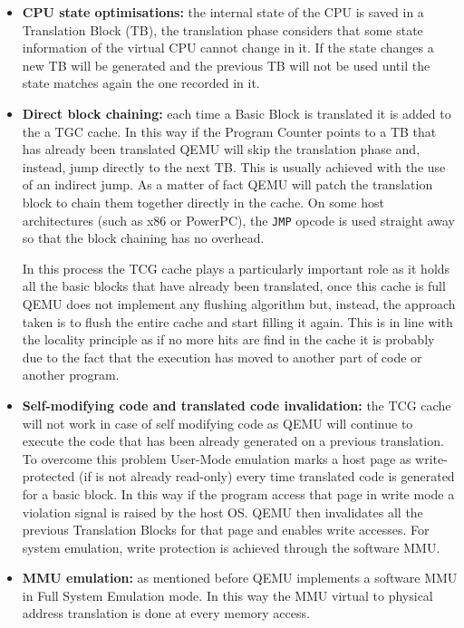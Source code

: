 \begin{itemize}
    \item \textbf{CPU state optimisations:} the internal state of the CPU is saved in a Translation Block (TB), the translation phase considers that some state information of the virtual CPU cannot change in it. If the state changes a new TB will be generated and the previous TB will not be used until the state matches again the one recorded in it.
    
    \item \textbf{Direct block chaining:} each time a Basic Block is translated it is added to the a TGC cache. In this way if the Program Counter points to a TB that has already been translated QEMU will skip the translation phase and, instead, jump directly to the next TB. This is usually achieved with the use of an indirect jump. As a matter of fact QEMU will patch the translation block to chain them together directly in the cache. On some host architectures (such as x86 or PowerPC), the \lstinline{JMP} opcode is used straight away so that the block chaining has no overhead.
    
    In this process the TCG cache plays a particularly important role as it holds all the basic blocks that have already been translated, once this cache is full QEMU does not implement any flushing algorithm but, instead, the approach taken is to flush the entire cache and start filling it again. This is in line with the locality principle as if no more hits are find in the cache it is probably due to the fact that the execution has moved to another part of code or another program.
    
    \item \textbf{Self-modifying code and translated code invalidation:} the TCG cache will not work in case of self modifying code as QEMU will continue to execute the code that has been already generated on a previous translation. To overcome this problem User-Mode emulation marks a host page as write-protected (if is not already read-only) every time translated code is generated for a basic block. In this way if the program access that page in write mode a violation signal is raised by the host OS. QEMU then invalidates all the previous Translation Blocks for that page and enables write accesses. For system emulation, write protection is achieved through the software MMU.
    
    
    \item \textbf{MMU emulation:} as mentioned before QEMU implements a software MMU in Full System Emulation mode. In this way the MMU virtual to physical address translation is done at every memory access.


\end{itemize}
